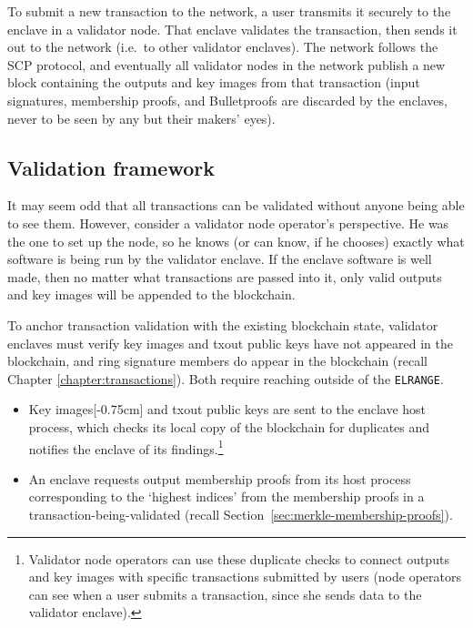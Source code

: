 To submit a new transaction to the network, a user transmits it securely to the enclave in a validator node. That enclave validates the transaction, then sends it out to the network (i.e.\ to other validator enclaves). The network follows the SCP protocol, and eventually all validator nodes in the network publish a new block containing the outputs and key images from that transaction (input signatures, membership proofs, and Bulletproofs are discarded by the enclaves, never to be seen by any but their makers' eyes).


\subsection{Validation framework}
\label{subsec:blockchain-validation-framework}

It may seem odd that all transactions can be validated without anyone being able to see them. However, consider a validator node operator's perspective. He was the one to set up the node, so he knows (or can know, if he chooses) exactly what software is being run by the validator enclave. If the enclave software is well made, then no matter what transactions are passed into it, only valid outputs and key images will be appended to the blockchain.

To anchor transaction validation with the existing blockchain state, validator enclaves must verify key images and txout public keys have not appeared in the blockchain, and ring signature members do appear in the blockchain (recall Chapter \ref{chapter:transactions}). Both require reaching outside of the {\tt ELRANGE}.

\begin{itemize}
    \item Key images[-0.75cm] and txout public keys are sent to the enclave host process, which checks its local copy of the blockchain for duplicates and notifies the enclave of its findings.\footnote{Validator node operators can use these duplicate checks to connect outputs and key images with specific transactions submitted by users (node operators can see when a user submits a transaction, since she sends data to the validator enclave).}

    \item An enclave requests output membership proofs from its host process corresponding to the `highest indices' from the membership proofs in a transaction-being-validated (recall Section~\ref{sec:merkle-membership-proofs}).
\end{itemize}


